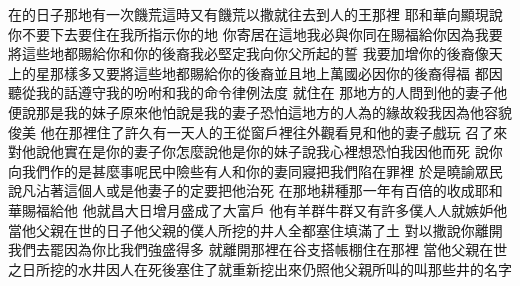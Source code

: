 \bchapter%
在的日子\chientien 那地有一次饑荒\yuentien 這時又有饑荒\chientien 以撒就往去\chientien 到人的王那裡\chuan 
{}耶和華向顯現\chientien 說\chientien 你不要下去\chientien 要住在我所指示你的地\chuan 
{}你寄居在這地\chientien 我必與你同在\chientien 賜福給你\chientien 因為我要將這些地都賜給你和你的後裔\chientien 我必堅定我向你父所起的誓\chuan 
{}我要加增你的後裔\chientien 像天上的星那樣多\yuentien 又要將這些地都賜給你的後裔\yuentien 並且地上萬國必因你的後裔得福\yuentien 
{}都因聽從我的話\chientien 遵守我的吩咐\chientien 和我的命令\chientien 律例\chientien 法度\chuan 
{}就住在\chuan 
{}那地方的人問到他的妻子\chientien 他便說\chientien 那是我的妹子\yuentien 原來他怕說\chientien 是我的妻子\yuentien{}\chientien 恐怕這地方的人\chientien 為的緣故殺我\chientien 因為他容貌俊美\chuan 
{}他在那裡住了許久\yuentien 有一天人的王\chientien 從窗戶裡往外觀看\chientien 見和他的妻子戲玩\chuan 
{}召了來\chientien 對他說\chientien 他實在是你的妻子\yuentien 你怎麼說\chientien 他是你的妹子\yuentien{}說\chientien 我心裡想\chientien 恐怕我因他而死\chuan 
{}說\chientien 你向我們作的是甚麼事呢\chientien 民中險些有人和你的妻同寢\chientien 把我們陷在罪裡\chuan 
{}於是曉諭眾民說\chientien 凡沾著這個人\chientien 或是他妻子的\chientien 定要把他治死\chuan\Chuan
{}在那地耕種\chientien 那一年有百倍的收成\chuan 耶和華賜福給他\chuan 
{}他就昌大\chientien 日增月盛\chientien 成了大富戶\chuan 
{}他有羊群\chientien 牛群\chientien 又有許多僕人\yuentien{}人就嫉妒他\chuan 
{}當他父親在世的日子\chientien 他父親的僕人所挖的井\chientien{}人全都塞住\chientien 填滿了土\chuan 
{}對以撒說\chientien 你離開我們去罷\chientien 因為你比我們強盛得多\chuan 
{}就離開那裡\chientien 在谷支搭帳棚\chientien 住在那裡\chuan\Chuan
{}當他父親在世之日所挖的水井\chientien 因人在死後塞住了\chientien{}就重新挖出來\chientien 仍照他父親所叫的\chientien 叫那些井的名字\chuan 
